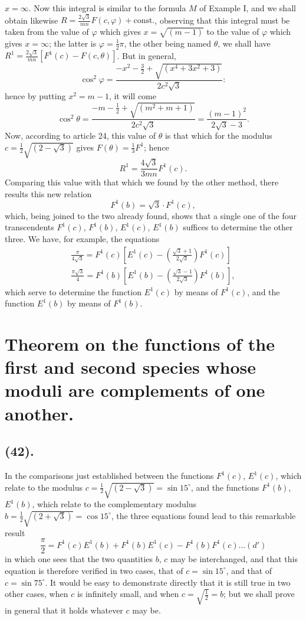 \documentclass{article}
\begin{document}
$x=\infty$. Now this integral is similar to the formula $M$ of Example I, and we shall obtain likewise $R=\frac{2\sqrt{3}}{mn}F(c,\varphi)+\text{const.}$, observing that this integral must be taken from the value of $\varphi$ which gives $x=\sqrt{(m-1)}$ to the value of $\varphi$ which gives $x=\infty$; the latter is $\varphi=\frac{1}{2}\pi$, the other being named $\theta$, we shall have $R^{1}=\frac{2\sqrt{3}}{mn}[F^{1}(c)-F(c,\theta)]$. But in general,
\[ \cos^{2}\varphi=\frac{-x^{2}-\frac{3}{2}+\sqrt{(x^{4}+3x^{2}+3)}}{2c^{2}\sqrt{3}}: \]
hence by putting $x^{2}=m-1$, it will come
\[ \cos^{2}\theta=\frac{-m-\frac{1}{2}+\sqrt{(m^{2}+m+1)}}{2c^{2}\sqrt{3}}=\frac{(m-1)^{2}}{2\sqrt{3}-3}. \]
Now, according to article 24, this value of $\theta$ is that which for the modulus $c=\frac{1}{2}\sqrt{(2-\sqrt{3})}$ gives $F(\theta)=\frac{1}{3}F^{1}$; hence
\[ R^{1}=\frac{4\sqrt{3}}{3mn}F^{1}(c). \]
Comparing this value with that which we found by the other method, there results this new relation
\[ F^{1}(b)=\sqrt{3}\cdot F^{1}(c), \]
which, being joined to the two already found, shows that a single one of the four transcendents $F^{1}(c)$, $F^{1}(b)$, $E^{1}(c)$, $E^{1}(b)$ suffices to determine the other three. We have, for example, the equations
\[ \begin{gathered} \frac{\pi}{4\sqrt{3}}=F^{1}(c)\left[E^{1}(c)-\left(\frac{\sqrt{3}+1}{2\sqrt{3}}\right)F^{1}(c)\right]\\ \frac{\pi\sqrt{3}}{4}=F^{1}(b)\left[E^{1}(b)-\left(\frac{\sqrt{3}-1}{2\sqrt{3}}\right)F^{1}(b)\right], \end{gathered} \]
which serve to determine the function $E^{1}(c)$ by means of $F^{1}(c)$, and the function $E^{1}(b)$ by means of $F^{1}(b)$.


\section*{Theorem on the functions of the first and second species whose moduli are complements of one another.}

\subsection*{(42).}

In the comparisons just established between the functions $F^{1}(c)$, $E^{1}(c)$, which relate to the modulus $c=\frac{1}{2}\sqrt{(2-\sqrt{3})}=\sin 15^{\circ}$, and the functions $F^{1}(b)$, $E^{1}(b)$, which relate to the complementary modulus $b=\frac{1}{2}\sqrt{(2+\sqrt{3})}=\cos 15^{\circ}$, the three equations found lead to this remarkable result
\[ \frac{\pi}{2}=F^{1}(c)E^{1}(b)+F^{1}(b)E^{1}(c)-F^{1}(b)F^{1}(c)\ldots(d') \]
in which one sees that the two quantities $b$, $c$ may be interchanged, and that this equation is therefore verified in two cases, that of $c=\sin 15^{\circ}$, and that of $c=\sin 75^{\circ}$. It would be easy to demonstrate directly that it is still true in two other cases, when $c$ is infinitely small, and when $c=\sqrt{\frac{1}{2}}=b$; but we shall prove in general that it holds whatever $c$ may be.
\end{document}
